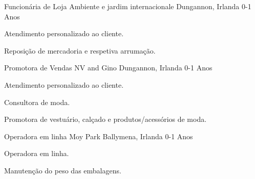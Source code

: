 \begin{cventries}
  \cventry    
    {Funcionária de Loja} %
    {Ambiente e jardim internacionale} %
    {Dungannon, Irlanda} %
    {0-1 Anos} %
    {
      \begin{cvitems} %
		\item {Atendimento personalizado ao cliente.}
  		\item {Reposição de mercadoria e respetiva arrumação.}
      \end{cvitems}
    }      

  \cventry    
    {Promotora de Vendas} %
    {NV and Gino} %
    {Dungannon, Irlanda} %
    {0-1 Anos} %
    {
      \begin{cvitems} %
		\item {Atendimento personalizado ao cliente.}
  		\item {Consultora de moda.}
  		\item {Promotora de vestuário, calçado e produtos/acessórios de moda.}
      \end{cvitems}
    }      

  \cventry    
    {Operadora em linha} %
    {Moy Park} %
    {Ballymena, Irlanda} %
    {0-1 Anos} %
    {
      \begin{cvitems} %
		\item {Operadora em linha.}
  		\item {Manutenção do peso das embalagens.}
      \end{cvitems}
    }   

    
     
\end{cventries}
